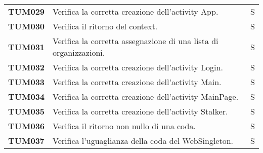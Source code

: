 \documentclass[../../piano-di-qualifica.tex]{subfiles}
\begin{document}
\begin{longtable}[H]{>{\centering\bfseries}m{3cm} >{}m{10cm} >{\centering\arraybackslash}m{3cm}}

  TUM029             & Verifica la corretta creazione dell'activity App.                                                                   & S                             \\ %

  TUM030             & Verifica il ritorno del context.                                                                                    & S                             \\ %

  TUM031             & Verifica la corretta assegnazione di una lista di organizzazioni.                                                   & S                             \\ %

  TUM032             & Verifica la corretta creazione dell'activity Login.                                                                 & S                             \\ %
  TUM033             & Verifica la corretta creazione dell'activity Main.                                                                  & S                             \\ %

  TUM034             & Verifica la corretta creazione dell'activity MainPage.                                                              & S                             \\ %

  TUM035             & Verifica la corretta creazione dell'activity Stalker.                                                               & S                             \\ %

  TUM036             & Verifica il ritorno non nullo di una coda.                                                                          & S                             \\ %

  TUM037             & Verifica l'uguaglianza della coda del WebSingleton.                                                                 & S                             \\ %


\end{longtable}
\end{document}
